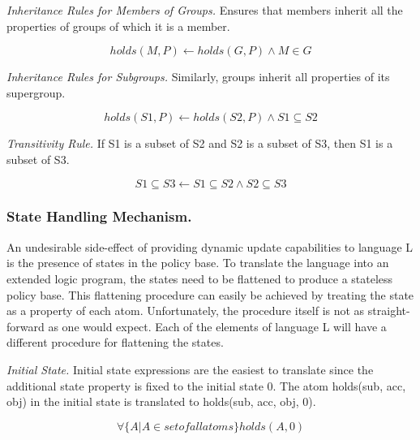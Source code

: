 \documentclass{llncs}
\begin{document}
        \emph{Inheritance Rules for Members of Groups.} Ensures that members
        inherit all the properties of groups of which it is a member.

        \begin{equation}
          holds(M, P) \leftarrow holds(G, P) \land M \in G
        \end{equation}

        \emph{Inheritance Rules for Subgroups.} Similarly, groups inherit all
        properties of its supergroup.

        \begin{equation}
          holds(S1, P) \leftarrow holds(S2, P) \land S1 \subseteq S2
        \end{equation}

        \emph{Transitivity Rule.} If S1 is a subset of S2 and S2 is a subset
        of S3, then S1 is a subset of S3.

        \begin{equation}
          S1 \subseteq S3 \leftarrow S1 \subseteq S2 \land S2 \subseteq S3
        \end{equation}

      \subsubsection{State Handling Mechanism.}

        An undesirable side-effect of providing dynamic update capabilities to
        language L is the presence of states in the policy base. To translate
        the language into an extended logic program, the states need to be
        flattened to produce a stateless policy base. This flattening
        procedure can easily be achieved by treating the state as a property
        of each atom. Unfortunately, the procedure itself is not as straight-
        forward as one would expect. Each of the elements of language L will
        have a different procedure for flattening the states.

        \emph{Initial State.} Initial state expressions are the easiest to
        translate since the additional state property is fixed to the initial
        state 0. The atom holds(sub, acc, obj) in the initial state is
        translated to holds(sub, acc, obj, 0).

        \begin{equation}
          \forall\{A | A \in set of all atoms\} holds(A, 0)
        \end{equation}
\end{document}
